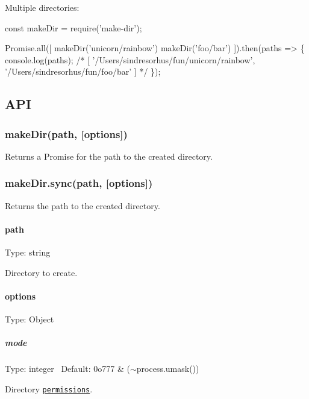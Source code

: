 

Multiple directories\+:


\begin{DoxyCode}
const makeDir = require('make-dir');

Promise.all([
  makeDir('unicorn/rainbow')
  makeDir('foo/bar')
]).then(paths => \{
  console.log(paths);
  /*
  [
    '/Users/sindresorhus/fun/unicorn/rainbow',
    '/Users/sindresorhus/fun/foo/bar'
  ]
  */
\});
\end{DoxyCode}


\subsection*{A\+PI}

\subsubsection*{make\+Dir(path, \mbox{[}options\mbox{]})}

Returns a {\ttfamily Promise} for the path to the created directory.

\subsubsection*{make\+Dir.\+sync(path, \mbox{[}options\mbox{]})}

Returns the path to the created directory.

\paragraph*{path}

Type\+: {\ttfamily string}

Directory to create.

\paragraph*{options}

Type\+: {\ttfamily Object}

\subparagraph*{mode}

Type\+: {\ttfamily integer}~\newline
 Default\+: {\ttfamily 0o777 \& ($\sim$process.umask())}

Directory \href{https://x-team.com/blog/file-system-permissions-umask-node-js/}{\tt permissions}.

